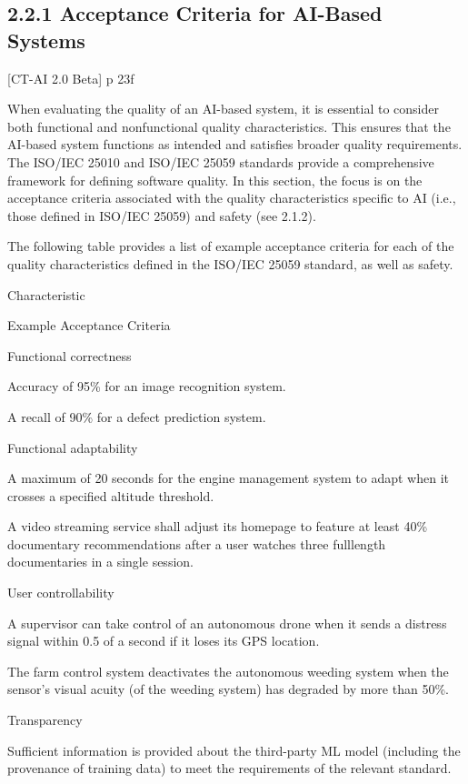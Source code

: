 \documentclass[
  letterpaper,
  DIV=11,
  numbers=noendperiod,
  oneside]{scrreprt}
\begin{document}
\begin{tcolorbox}
\section{2.2.1 Acceptance Criteria for AI-Based
Systems}\label{acceptance-criteria-for-ai-based-systems-1}

{[}CT-AI 2.0 Beta{]} p 23f

When evaluating the quality of an AI-based system, it is essential to
consider both functional and nonfunctional quality characteristics. This
ensures that the AI-based system functions as intended and satisfies
broader quality requirements. The ISO/IEC 25010 and ISO/IEC 25059
standards provide a comprehensive framework for defining software
quality. In this section, the focus is on the acceptance criteria
associated with the quality characteristics specific to AI (i.e., those
defined in ISO/IEC 25059) and safety (see 2.1.2).

The following table provides a list of example acceptance criteria for
each of the quality characteristics defined in the ISO/IEC 25059
standard, as well as safety.

Characteristic

Example Acceptance Criteria

Functional correctness

Accuracy of 95\% for an image recognition system.

A recall of 90\% for a defect prediction system.

Functional adaptability

A maximum of 20 seconds for the engine management system to adapt when
it crosses a specified altitude threshold.

A video streaming service shall adjust its homepage to feature at least
40\% documentary recommendations after a user watches three fulllength
documentaries in a single session.

User controllability

A supervisor can take control of an autonomous drone when it sends a
distress signal within 0.5 of a second if it loses its GPS location.

The farm control system deactivates the autonomous weeding system when
the sensor's visual acuity (of the weeding system) has degraded by more
than 50\%.

Transparency

Sufficient information is provided about the third-party ML model
(including the provenance of training data) to meet the requirements of
the relevant standard.


\end{tcolorbox}
\end{document}
